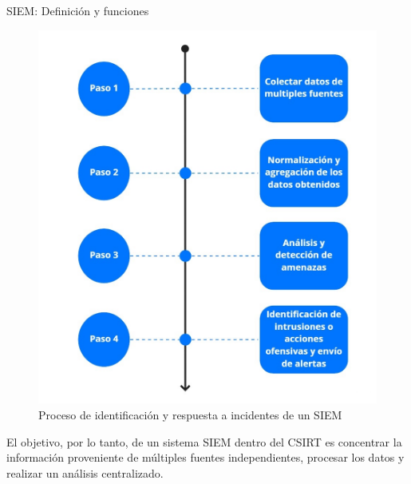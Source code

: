 \begin{section}{SIEM: Definición y funciones}
\begin{figure}[H]
            \includegraphics[width=1\textwidth]{./marco_teorico_imagenes/figura_9_procesos_de_un_siem.jpg}
            \caption{Proceso de identificación y respuesta a incidentes de un SIEM}
            \label{fig:procesos_siem}
        \end{figure}
        \FloatBarrier    
        El objetivo, por lo tanto, de un sistema SIEM dentro del CSIRT es concentrar la información proveniente de múltiples fuentes independientes, procesar los datos y realizar un análisis centralizado.
    \end{section}
    \pagebreak
